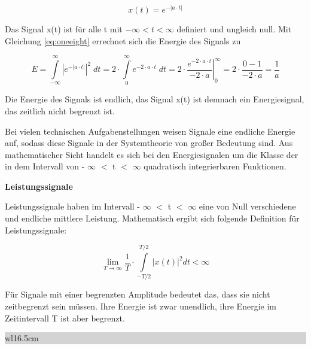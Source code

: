\begin{equation}\label{eq:oneeight}
x(t)=e^{\displaystyle -\left|a\cdot t\right|}
\end{equation}

\noindent Das Signal x(t) ist f\"{u}r alle t mit  $-\infty < t < \infty$ definiert und ungleich null. Mit Gleichung \ref{eq:oneeight} errechnet sich die Energie des Signals zu

\begin{equation}\label{eq:onenine}
E=\int\limits _{-\infty }^{\infty }\left|e^{\displaystyle -\left|a\cdot t\right|} \right|^{2} \;  dt=2\cdot \int\limits _{0}^{\infty }e^{\displaystyle -2\cdot a\cdot t}  \;  dt=\left. 2\cdot \dfrac{e^{\displaystyle -2\cdot a\cdot t} }{-2\cdot a} \right|_{0}^{\infty } =2\cdot \dfrac{0-1}{-2\cdot a} =\dfrac{1}{a} 
\end{equation}


\noindent Die Energie des Signals ist endlich, das Signal x(t) ist demnach ein Energiesignal, das zeitlich nicht begrenzt ist. 

\noindent 

\noindent Bei vielen technischen Aufgabenstellungen weisen Signale eine endliche Energie auf, sodass diese Signale in der Systemtheorie von gro{\ss}er Bedeutung sind. Aus mathematischer Sicht handelt es sich bei den Energiesignalen um die Klasse der in dem Intervall von - $\infty$ $\mathrm{<}$ t $\mathrm{<}$ $\infty$ quadratisch integrierbaren Funktionen. \bigskip

{\selectfont
\noindent\textbf{Leistungssignale}} \smallskip

\noindent Leistungssignale haben im Intervall - $\infty$ $\mathrm{<}$ t $\mathrm{<}$ $\infty$ eine von Null verschiedene und endliche mittlere Leistung. Mathematisch ergibt sich folgende Definition f\"{u}r Leistungssignale:

\begin{equation}\label{eq:oneten}
\lim_{T \to \infty} \dfrac{1}{T}\cdot \int\limits _{-T/2}^{T/2}\left|x(t)\right|^{2} dt <\infty
\end{equation}

\noindent F\"{u}r Signale mit einer begrenzten Amplitude bedeutet das, dass sie nicht zeitbegrenzt sein m\"{u}ssen. Ihre Energie ist zwar unendlich, ihre Energie im Zeitintervall T ist aber begrenzt. 

\clearpage
\noindent
\colorbox{lightgray}{%
%
\renewcommand\arraystretch{0.6}%
\begin{tabular}{ wl{16.5cm} }
{\selectfont
{}}
\end{tabular}%
}\bigskip

